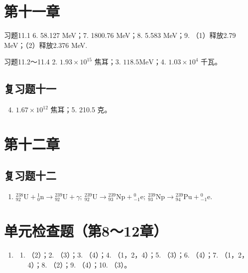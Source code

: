 \section{第十一章}

习题11.1 6. 58.127 MeV；7. 1800.76 MeV；8. 5.583 MeV；9. （1）释放2.79
MeV；（2）释放2.376 MeV.

习题11.2～11.4 2. \(1.93 \times 10^{15}\) 焦耳；3.
\(118.5 \mathrm{MeV}\)；4. \(1.03 \times 10^{4}\) 千瓦。

\subsection{复习题十一}

\begin{enumerate}
\setcounter{enumi}{3}
\item
  \(1.67 \times 10^{12}\) 焦耳；5. 210.5 克。
\end{enumerate}

\section{第十二章}

\subsection{复习题十二}

\begin{enumerate}
\item
  \(^{238}_{92}\mathrm{U}+{}^{1}_{0}\mathrm{n}\longrightarrow{}^{239}_{92}\mathrm{U}+\gamma;\ {}^{239}_{92}\mathrm{U}\longrightarrow{}^{239}_{93}\mathrm{Np}+{}^{0}_{-1}\mathrm{e};\ {}^{239}_{93}\mathrm{Np}\longrightarrow{}^{239}_{94}\mathrm{Pu}+{}^{0}_{-1}\mathrm{e}.\)
\end{enumerate}

\section{单元检查题（第8～12章）}

\begin{enumerate}
\item
  \begin{enumerate}
  \item
    （2）；2. （3）；3. （4）；4. （1，2，4）；5. （3）；6. （4）；7.
    （1，2，4）；8. （2）；9. （4）；10. （3）。
  \end{enumerate}
\end{enumerate}

